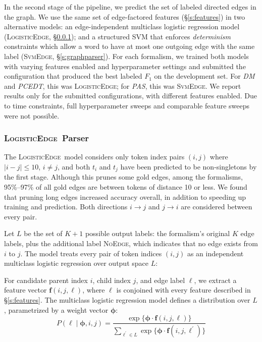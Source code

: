 \documentclass[11pt]{article}
\newcommand{\codenote}[1]{}
\newcommand{\logitedge}{\textsc{LogisticEdge}}
\newcommand{\svmedge}{\textsc{SvmEdge}}
\newcommand{\noedge}{\textsc{NoEdge}}
\begin{document}
In the second stage of the pipeline, we predict the set of labeled directed
edges in the graph.
We use the same set of edge-factored features (\S\ref{s:features}) in two
alternative models: an edge-independent multiclass logistic
regression model (\logitedge, \S\ref{s:logitedge}); and a structured SVM 
\cite{taskar_max_2003,tsochantaridis_support_2004} that enforces 
\emph{determinism} constraints which allow a word to
have at most one outgoing edge with the
same label (\svmedge, \S\ref{s:graphparser}).
For each formalism, we trained both models with varying features enabled and
hyperparameter settings and submitted the configuration that produced the best
labeled $F_1$ on the development set.
For \emph{DM} and \emph{PCEDT}, this was \logitedge;
for \emph{PAS}, this was \svmedge.
We report results only for the submitted configurations, with different features
enabled.
Due to time constraints, full hyperparameter sweeps and comparable feature sweeps were not possible.


\subsubsection{\logitedge\ Parser}
\label{s:logitedge}


\codenote{LRParser.java}

The \logitedge\ model considers only token index pairs $(i, j)$ where %
$|i-j| \leq 10$, $i \ne j$, and both $t_i$ and
$t_j$ have been predicted to be non-singletons by the first stage.
Although this prunes some gold edges, among the formalisms,
95\%--97\% of all gold edges are between tokens of distance 10 or less.
We found that pruning long edges increased accuracy overall, in addition to
speeding up training and prediction.
Both directions $i \rightarrow j$ and $j \rightarrow
i$ are considered between every pair.

Let $L$ be the set of $K+1$ possible output labels: the formalism's original $K$
edge labels, plus the additional label \noedge, which indicates that no edge
exists from $i$ to $j$.
The model treats every pair of token indices $(i, j)$ as an
independent multiclass logistic regression over output space $L$:


For candidate parent index $i$, child index $j$, and edge label $\ell$, we
extract a feature vector $\bm{f}(i, j, \ell)$, where $\ell$ is conjoined with every
feature described in \S\ref{s:features}.
The multiclass logistic regression model defines a distribution over $L$,
parametrized by a weight vector $\bm\phi$:
\[
  P(\ell\mid\bm\phi,i,j)  = \frac{
  	\exp\{\bm\phi \cdot \bm{f}(i, j, \ell)\}
  } {
  	\sum_{\ell^\prime \in L} {
  		\exp\{\bm\phi \cdot \bm{f}(i, j, \ell^\prime)\}
  	}
  }
\]
\end{document}
